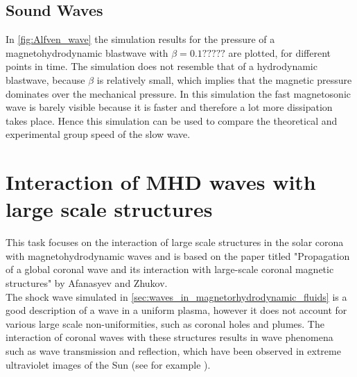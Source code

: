 \documentclass[a4paper]{article}
\let\oldcap\caption
\renewcommand{\caption}[1]{\parbox{.9\linewidth}{\oldcap{#1}}}
\begin{document}

\subsection{Sound Waves}
In \cref{fig:Alfven_wave} the simulation results for the pressure of a magnetohydrodynamic blastwave with $\beta = 0.1?????$ are plotted, for different points in time. 
The simulation does not resemble that of a hydrodynamic blastwave, because $\beta$ is relatively small, which implies that the magnetic pressure dominates over the mechanical pressure.
In this simulation the fast magnetosonic wave is barely visible because it is faster and therefore a lot more dissipation takes place. 
Hence this simulation can be used to compare the theoretical and 
experimental group speed of the slow wave.
\section{Interaction of MHD waves with large scale structures}
This task focuses on the interaction of large scale structures in the solar corona with magnetohydrodynamic waves and is based on the paper titled "Propagation of a global coronal wave and its interaction with large-scale coronal magnetic structures" by Afanasyev and Zhukov.  \cite{afanasyev2018propagation}\\

The shock wave simulated in \cref{sec:waves_in_magnetorhydrodynamic_fluids} is a good description of a wave in a uniform plasma, however it does not account for various large scale non-uniformities, such as coronal holes and plumes. The interaction of coronal waves with these structures results in wave phenomena such as wave transmission and reflection, which have been observed in extreme ultraviolet images of the Sun (see for example \cite{gopalswamy2009euv}).
\end{document}

